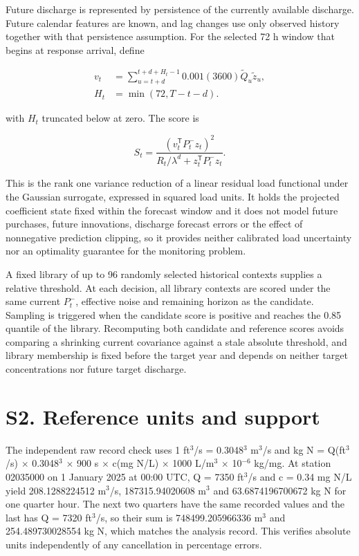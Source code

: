\documentclass[lineno,pdflatex,sn-apa]{sn-jnl}%
\theoremstyle{thmstyleone}%
\theoremstyle{thmstyletwo}%
\theoremstyle{thmstylethree}%
\begin{document}
Future discharge is represented by persistence of the currently available discharge. Future calendar features are known, and lag changes use only observed history together with that persistence assumption. For the selected 72 h window that begins at response arrival, define

\begin{align}
v_t &= \sum_{u=t+d}^{t+d+H_t-1} 0.001(3600)\widetilde Q_u\widetilde z_u,\\
H_t &= \min(72,T-t-d).
\end{align}

with $H_t$ truncated below at zero. The score is

\begin{equation}
S_t=\frac{(v_t^{\mathsf T}P_t^-z_t)^2} {R_t/\lambda^d+z_t^{\mathsf T}P_t^-z_t}.
\end{equation}

This is the rank one variance reduction of a linear residual load functional under the Gaussian surrogate, expressed in squared load units. It holds the projected coefficient state fixed within the forecast window and it does not model future purchases, future innovations, discharge forecast errors or the effect of nonnegative prediction clipping, so it provides neither calibrated load uncertainty nor an optimality guarantee for the monitoring problem.

A fixed library of up to 96 randomly selected historical contexts supplies a relative threshold. At each decision, all library contexts are scored under the same current $P_t^-$, effective noise and remaining horizon as the candidate. Sampling is triggered when the candidate score is positive and reaches the 0.85 quantile of the library. Recomputing both candidate and reference scores avoids comparing a shrinking current covariance against a stale absolute threshold, and library membership is fixed before the target year and depends on neither target concentrations nor future target discharge.

\section*{S2. Reference units and support}

The independent raw record check uses 1 ft$^{3}$/s = 0.3048$^{3}$ m$^{3}$/s and kg N = Q(ft$^{3}$/s) $\times$ 0.3048$^{3}$ $\times$ 900 s $\times$ c(mg N/L) $\times$ 1000 L/m$^{3}$ $\times$ 10$^{-6}$ kg/mg. At station 02035000 on 1 January 2025 at 00:00 UTC, Q = 7350 ft$^{3}$/s and c = 0.34 mg N/L yield 208.1288224512 m$^{3}$/s, 187315.94020608 m$^{3}$ and 63.6874196700672 kg N for one quarter hour. The next two quarters have the same recorded values and the last has Q = 7320 ft$^{3}$/s, so their sum is 748499.205966336 m$^{3}$ and 254.489730028554 kg N, which matches the analysis record. This verifies absolute units independently of any cancellation in percentage errors.
\end{document}

